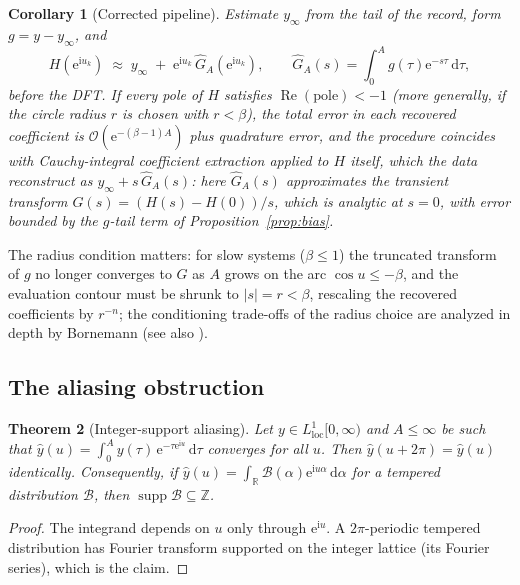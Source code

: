 \documentclass[11pt, a4paper]{article}
\newtheorem{theorem}{Theorem}[section]
\newtheorem{corollary}[theorem]{Corollary}
\theoremstyle{definition}
\theoremstyle{remark}
\newcommand{\R}{\mathbb{R}}
\newcommand{\Z}{\mathbb{Z}}
\newcommand{\dd}{\,\mathrm{d}}
\newcommand{\ii}{\mathrm{i}}
\newcommand{\ee}{\mathrm{e}}
\begin{document}
\begin{corollary}[Corrected pipeline]\label{cor:corrected}
Estimate $y_\infty$ from the tail of the record, form $g=y-y_\infty$, and
\begin{equation}\label{eq:corrected}
H(\ee^{\ii u_k})\; \approx\; y_\infty \;+\; \ee^{\ii u_k}\,
\widehat{G}_{\!A}(\ee^{\ii u_k}),
\qquad \widehat{G}_{\!A}(s)=\int_0^{A}g(\tau)\ee^{-s\tau}\dd\tau ,
\end{equation}
before the DFT. If every pole of $H$ satisfies
$\operatorname{Re}(\text{pole})<-1$ (more generally, if the circle radius
$r$ is chosen with $r<\beta$), the total error in each recovered
coefficient is $\mathcal{O}(\ee^{-(\beta-1)A})$ plus quadrature error, and
the procedure coincides with Cauchy-integral coefficient extraction
\cite{LynessMoler1967,Henrici1979, Fornberg1981} applied to $H$ itself,
which the data reconstruct as $y_\infty+s\, \widehat{G}_{\!A}(s)$: here
$\widehat{G}_{\!A}(s)$ approximates the transient transform
$G(s)=(H(s)-H(0))/s$, which is analytic at $s=0$, with error bounded by
the $g$-tail term of Proposition~\ref{prop:bias}.
\end{corollary}

The radius condition matters: for slow systems ($\beta\le1$) the truncated
transform of $g$ no longer converges to $G$ as $A$ grows on the arc
$\cos u\le-\beta$, and the evaluation contour must be shrunk to
$|s|=r<\beta$, rescaling the recovered coefficients by $r^{-n}$; the
conditioning trade-offs of the radius choice are analyzed in depth by
Bornemann \cite{Bornemann2011} (see also
\cite{AustinKravanjaTrefethen2014}).

\subsection{The aliasing obstruction}\label{sec:aliasing}

\begin{theorem}[Integer-support aliasing]\label{thm:aliasing}
Let $y\in L^{1}_{\mathrm{loc}}[0, \infty)$ and $A\le\infty$ be such that
$\widehat{y}(u)=\int_0^{A}y(\tau)\,\ee^{-\tau \ee^{\ii u}}\dd\tau$ converges
for all $u$. Then $\widehat{y}(u+2\pi)=\widehat{y}(u)$ identically.
Consequently, if $\widehat{y}(u)=\int_{\R} \mathcal{B}(\alpha)\ee^{\ii
u\alpha}\dd\alpha$ for a tempered distribution $\mathcal{B}$, then
$\operatorname{supp}\mathcal{B}\subseteq\Z$.
\end{theorem}

\begin{proof}
The integrand depends on $u$ only through $\ee^{\ii u}$. A $2\pi$-periodic
tempered distribution has Fourier transform supported on the integer
lattice (its Fourier series), which is the claim.
\end{proof}
\end{document}
